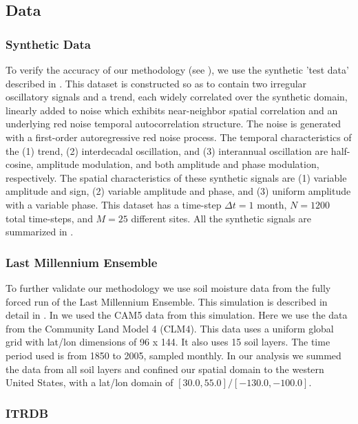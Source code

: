 \documentclass[phd,tocprelim]{cornell}
\begin{document}
\subsection{Data}\label{data:2}

\subsubsection{Synthetic Data}\label{synth:data}

To verify the accuracy of our methodology (see ), we use 
the synthetic 'test data' described in \cite{mann1999oscillatory}.
This dataset is constructed so as to contain two irregular oscillatory 
signals and a trend, each widely correlated over the synthetic domain, 
linearly added to noise which exhibits near-neighbor spatial correlation 
and an underlying red noise temporal autocorrelation structure. The 
noise is generated with a first-order autoregressive red noise process. 
The temporal characteristics of the (1) trend, (2) interdecadal oscillation, 
and (3) interannual oscillation are half-cosine, amplitude modulation, 
and both amplitude and phase modulation, respectively. The spatial 
characteristics of these synthetic signals are (1) variable amplitude 
and sign, (2) variable amplitude and phase, and (3) uniform amplitude 
with a variable phase. This dataset has a time-step $\Delta t=1$ month, 
$N=1200$ total time-steps, and $M=25$ different sites. All the 
synthetic signals are summarized in .

\subsubsection{Last Millennium Ensemble}\label{lme:soi}

To further validate our methodology we use soil moisture data from the 
fully forced run of the Last Millennium Ensemble. This simulation is 
described in detail in . In  we used the 
CAM5 data from this simulation. Here we use the data from the Community 
Land Model 4 (CLM4). This data uses a uniform global grid with lat/lon 
dimensions of 96 x 144. It also uses 15 soil layers. The time period used 
is from 1850 to 2005, sampled monthly. In our analysis we summed the data 
from all soil layers and confined our spatial domain to the western 
United States, with a lat/lon domain of $[30.0,55.0]/[-130.0,-100.0]$.

\subsubsection{ITRDB}\label{itrdb_data}
\end{document}
